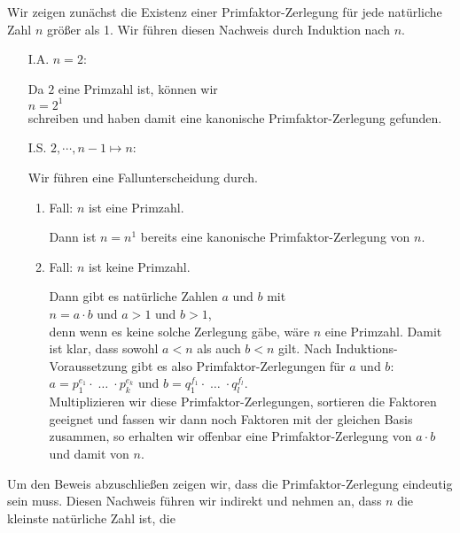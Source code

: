 \proof
Wir zeigen zunächst die Existenz einer Primfaktor-Zerlegung für jede natürliche Zahl $n$ größer als
1.  Wir führen diesen Nachweis durch Induktion nach $n$.
\begin{enumerate}
\item[I.A.] $n=2$:

      Da $2$ eine Primzahl ist, können wir
      \\[0.2cm]
      \hspace*{1.3cm}
      $n = 2^1$
      \\[0.2cm]
      schreiben und haben damit eine kanonische Primfaktor-Zerlegung gefunden.
\item[I.S.] $2,\cdots,n\!-\!1 \mapsto n$: 

      Wir führen eine Fallunterscheidung durch.
      \begin{enumerate}
      \item Fall: $n$ ist eine Primzahl.

            Dann ist $n = n^1$  bereits eine kanonische Primfaktor-Zerlegung von $n$.
      \item Fall: $n$ ist keine Primzahl.  

            Dann gibt es natürliche Zahlen $a$ und $b$ mit
            \\[0.2cm]
            \hspace*{1.3cm}
            $n = a \cdot b$ \quad und $a > 1$ und $b > 1$,
            \\[0.2cm]
            denn wenn es keine solche Zerlegung gäbe, wäre $n$ eine Primzahl. Damit ist klar, dass
            sowohl $a < n$ als auch $b < n$ gilt.  Nach Induktions-Voraussetzung gibt es also
            Primfaktor-Zerlegungen für $a$ und $b$:
            \\[0.2cm]
            \hspace*{1.3cm}
             $a = p_1^{e_1} \cdot \;\dots\; \cdot p_k^{e_k}$ \quad und \quad
             $b = q_1^{f_1} \cdot \;\dots\; \cdot q_l^{f_l}$.
            \\[0.2cm]
            Multiplizieren wir diese Primfaktor-Zerlegungen, sortieren die Faktoren geeignet und
            fassen wir dann noch Faktoren mit der gleichen Basis zusammen, so erhalten wir offenbar
            eine Primfaktor-Zerlegung von $a \cdot b$ und damit von $n$.
      \end{enumerate}
\end{enumerate}
Um den Beweis abzuschließen zeigen wir, dass die Primfaktor-Zerlegung eindeutig sein muss.
Diesen Nachweis führen wir indirekt und nehmen an, dass $n$ die kleinste natürliche Zahl ist, die
